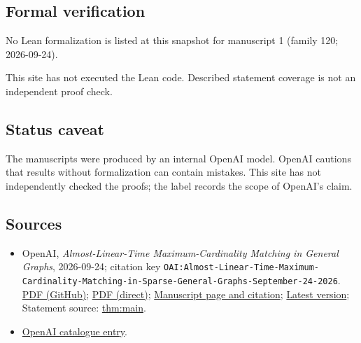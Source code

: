 \documentclass[11pt]{article}
\begin{document}
\subsection{Formal verification}
No Lean formalization is listed at this snapshot for manuscript 1 (family 120; 2026-09-24).

This site has not executed the Lean code. Described statement coverage is not an independent proof check.

\subsection{Status caveat}
The manuscripts were produced by an internal OpenAI model. OpenAI cautions that results without formalization can contain mistakes. This site has not independently checked the proofs; the label records the scope of OpenAI's claim.

\subsection{Sources}
\begin{itemize}
\item OpenAI, \emph{Almost-Linear-Time Maximum-Cardinality Matching in General Graphs}, 2026-09-24; citation key \texttt{OAI:Almost-Linear-Time-Maximum-Cardinality-Matching-in-Sparse-General-Graphs-September-24-2026}. \href{https://github.com/openai/math/blob/adc7f1241b42e322a6451854ab7e4b4c146bf78a/preprints/Almost-Linear-Time-Maximum-Cardinality-Matching-in-Sparse-General-Graphs-September-24-2026/main.pdf}{PDF (GitHub)}; \href{https://github.com/openai/math/raw/adc7f1241b42e322a6451854ab7e4b4c146bf78a/preprints/Almost-Linear-Time-Maximum-Cardinality-Matching-in-Sparse-General-Graphs-September-24-2026/main.pdf}{PDF (direct)}; \href{https://github.com/openai/math/blob/adc7f1241b42e322a6451854ab7e4b4c146bf78a/preprints/Almost-Linear-Time-Maximum-Cardinality-Matching-in-Sparse-General-Graphs-September-24-2026/README.md}{Manuscript page and citation}; \href{https://github.com/openai/math/blob/main/preprints/Almost-Linear-Time-Maximum-Cardinality-Matching-in-Sparse-General-Graphs-September-24-2026/main.pdf}{Latest version}; Statement source: \href{https://github.com/openai/math/blob/adc7f1241b42e322a6451854ab7e4b4c146bf78a/preprints/Almost-Linear-Time-Maximum-Cardinality-Matching-in-Sparse-General-Graphs-September-24-2026/build/sections/01-introduction.tex\#L34}{thm:main}.
\item \href{https://github.com/openai/math/blob/adc7f1241b42e322a6451854ab7e4b4c146bf78a/CONTENTS.md}{OpenAI catalogue entry}.
\end{itemize}
\end{document}
